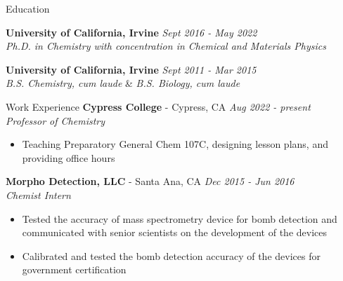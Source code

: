 \documentclass{resume} %
\begin{document}
{\centerline { } }
\vspace{-0.3in}

\begin{rSection}{Education}

{\bf University of California, Irvine} \hfill {\em Sept 2016 - May 2022} 
\\{\textit{Ph.D. in Chemistry with concentration in Chemical and Materials Physics}}

{\bf University of California, Irvine} \hfill {\em Sept 2011 - Mar 2015} 
\\ { \textit{B.S. Chemistry, cum laude}} \& {\textit{B.S. Biology, cum laude}} \hfill

\end{rSection}

\begin{rSection}{Work Experience}
  {\bf Cypress College} - Cypress, CA \hfill {\em Aug 2022 - present}  \\
  {\textit{Professor of Chemistry}}
  \vspace{-0.5em}
  \begin{itemize}
    \itemsep-0.75em
  \item Teaching Preparatory General Chem 107C, designing lesson plans, and providing
  office hours
  \end{itemize}
  
  {\bf Morpho Detection, LLC} - Santa Ana, CA \hfill {\em Dec 2015 - Jun 2016}  \\
  {\textit{Chemist Intern}}
  \vspace{-0.5em}
  \begin{itemize}
  \itemsep-0.75em
  \item Tested the accuracy of mass spectrometry device for bomb detection and communicated
    with senior scientists on the development of the devices
  \item Calibrated and tested the bomb detection accuracy of the devices for
    government certification
  \end{itemize}  

\end{rSection}
\end{document}
